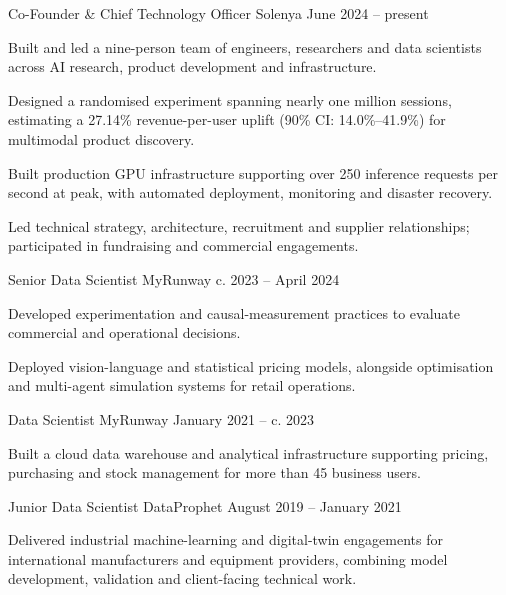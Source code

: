 \begin{cventries}
  \cventry
  {Co-Founder \& Chief Technology Officer}
  {Solenya}
  {}
  {June 2024 -- present}
  {
    \begin{cvitems}
    \item {Built and led a nine-person team of engineers, researchers
        and data scientists across AI research, product development and
      infrastructure.}
    \item {Designed a randomised experiment spanning nearly one
        million sessions, estimating a 27.14\% revenue-per-user uplift
      (90\% CI: 14.0\%--41.9\%) for multimodal product discovery.}
    \item {Built production GPU infrastructure supporting over 250
        inference requests per second at peak, with automated
      deployment, monitoring and disaster recovery.}
    \item {Led technical strategy, architecture, recruitment and
        supplier relationships; participated in fundraising and
      commercial engagements.}
  \end{cvitems}}
  \cventry
  {Senior Data Scientist}
  {MyRunway}
  {}
  {c. 2023 -- April 2024}
  {
    \begin{cvitems}
    \item {Developed experimentation and causal-measurement practices
      to evaluate commercial and operational decisions.}
    \item {Deployed vision-language and statistical pricing models,
        alongside optimisation and multi-agent simulation systems for
      retail operations.}
  \end{cvitems}}
  \cventry
  {Data Scientist}
  {MyRunway}
  {}
  {January 2021 -- c. 2023}
  {
    \begin{cvitems}
    \item {Built a cloud data warehouse and analytical infrastructure
        supporting pricing, purchasing and stock management for more
      than 45 business users.}
  \end{cvitems}}
  \cventry
  {Junior Data Scientist}
  {DataProphet}
  {}
  {August 2019 -- January 2021}
  {
    \begin{cvitems}
    \item {Delivered industrial machine-learning and digital-twin
        engagements for international manufacturers and equipment
        providers, combining model development, validation and
      client-facing technical work.}
  \end{cvitems}}

\end{cventries}
